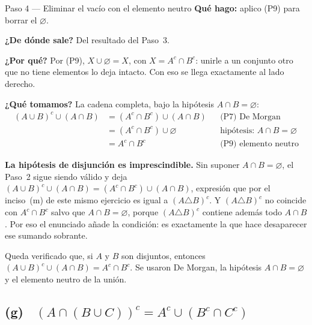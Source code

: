 \documentclass[11pt]{article}
\begin{document}
\begin{paso}{Paso 4 --- Eliminar el vacío con el elemento neutro}
\textbf{Qué hago:} aplico (P9) para borrar el $\varnothing$.

\textbf{¿De dónde sale?} Del resultado del Paso~3.

\textbf{¿Por qué?} Por (P9), $X\cup\varnothing=X$, con $X=A^{c}\cap B^{c}$: unirle a un conjunto
otro que no tiene elementos lo deja intacto. Con eso se llega exactamente al lado derecho.

\textbf{¿Qué tomamos?} La cadena completa, bajo la hipótesis $A\cap B=\varnothing$:
\begin{align*}
(A\cup B)^{c}\cup(A\cap B)
&=(A^{c}\cap B^{c})\cup(A\cap B) && \text{(P7) De Morgan}\\
&=(A^{c}\cap B^{c})\cup\varnothing && \text{hipótesis: }A\cap B=\varnothing\\
&=A^{c}\cap B^{c} && \text{(P9) elemento neutro}
\end{align*}
\end{paso}

\begin{nota}
\textbf{La hipótesis de disjunción es imprescindible.}
Sin suponer $A\cap B=\varnothing$, el Paso~2 sigue siendo válido y deja
$(A\cup B)^{c}\cup(A\cap B)=(A^{c}\cap B^{c})\cup(A\cap B)$, expresión que por el inciso~(m) de
este mismo ejercicio es igual a $(A\triangle B)^{c}$. Y $(A\triangle B)^{c}$ no coincide con
$A^{c}\cap B^{c}$ salvo que $A\cap B=\varnothing$, porque $(A\triangle B)^{c}$ contiene además
todo $A\cap B$. Por eso el enunciado añade la condición: es exactamente la que hace desaparecer
ese sumando sobrante.
\end{nota}

\begin{resp}
Queda verificado que, si $A$ y $B$ son disjuntos, entonces
$(A\cup B)^{c}\cup(A\cap B)=A^{c}\cap B^{c}$. Se usaron De Morgan, la hipótesis
$A\cap B=\varnothing$ y el elemento neutro de la unión.
\end{resp}

\subsection*{(g) \ $(A\cap(B\cup C))^{c}=A^{c}\cup(B^{c}\cap C^{c})$}
\end{document}
